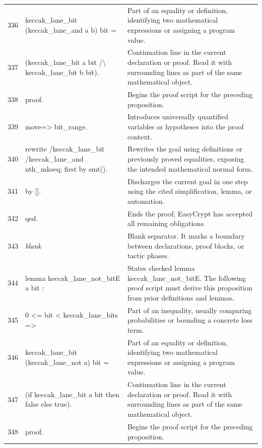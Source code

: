 \documentclass[10pt]{article}
\begin{document}
\begin{longtable}{r L{0.53\textwidth} L{0.37\textwidth}}
336 & {\ttfamily\scriptsize   keccak\_lane\_bit (keccak\_lane\_and a b) bit =} & Part of an equality or definition, identifying two mathematical expressions or assigning a program value. \\
337 & {\ttfamily\scriptsize   (keccak\_lane\_bit a bit /\textbackslash{} keccak\_lane\_bit b bit).} & Continuation line in the current declaration or proof.  Read it with surrounding lines as part of the same mathematical object. \\
338 & {\ttfamily\scriptsize proof.} & Begins the proof script for the preceding proposition. \\
339 & {\ttfamily\scriptsize move=> bit\_range.} & Introduces universally quantified variables or hypotheses into the proof context. \\
340 & {\ttfamily\scriptsize rewrite /keccak\_lane\_bit /keccak\_lane\_and nth\_mkseq; first by smt().} & Rewrites the goal using definitions or previously proved equalities, exposing the intended mathematical normal form. \\
341 & {\ttfamily\scriptsize by [].} & Discharges the current goal in one step using the cited simplification, lemma, or automation. \\
342 & {\ttfamily\scriptsize qed.} & Ends the proof; EasyCrypt has accepted all remaining obligations. \\
343 & {\ttfamily\scriptsize \emph{blank}} & Blank separator.  It marks a boundary between declarations, proof blocks, or tactic phases. \\
344 & {\ttfamily\scriptsize lemma keccak\_lane\_not\_bitE a bit :} & States checked lemma keccak\_lane\_not\_bitE.  The following proof script must derive this proposition from prior definitions and lemmas. \\
345 & {\ttfamily\scriptsize   0 <= bit < keccak\_lane\_bits =>} & Part of an inequality, usually comparing probabilities or bounding a concrete loss term. \\
346 & {\ttfamily\scriptsize   keccak\_lane\_bit (keccak\_lane\_not a) bit =} & Part of an equality or definition, identifying two mathematical expressions or assigning a program value. \\
347 & {\ttfamily\scriptsize   (if keccak\_lane\_bit a bit then false else true).} & Continuation line in the current declaration or proof.  Read it with surrounding lines as part of the same mathematical object. \\
348 & {\ttfamily\scriptsize proof.} & Begins the proof script for the preceding proposition. \\

\end{longtable}
\end{document}
